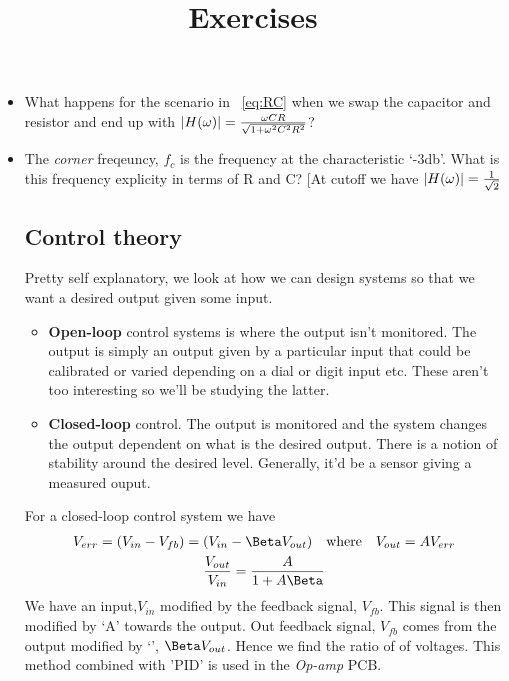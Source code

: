 \par
\title{\large{Exercises}}
\begin{itemize}
\item What happens for the scenario in ~\ref{eq:RC} when we swap the capacitor and resistor and end up with \begin{math}\abs{H(\omega)} = \frac{\omega CR}{\sqrt{1 + \omega^{2}C^{2}R^{2}}}\end{math}? 
\item The \textit{corner} freqeuncy, $f_c$ is the frequency at the characteristic `-3db'.  What is this frequency explicity in terms of R and C? [At cutoff we have \begin{math} \abs{H(\omega)} = \frac{1}{\sqrt{2}} \end{math}

\subsection{Control theory}
Pretty self explanatory, we look at how we can design systems so that we want a desired output given some input. 
\begin{itemize}
\item \textbf{Open-loop} control systems is where the output isn't monitored. The output is simply an output given by a particular input that could be calibrated or varied depending on a dial or digit input etc. These aren't too interesting so we'll be studying the latter.
\item \textbf{Closed-loop} control. The output is monitored and the system changes the output dependent on what is the desired output. There is a notion of stability around the desired level. Generally, it'd be a sensor giving a measured ouput.
\end{itemize}
For a closed-loop control system we have
\begin{equation}
\begin{gathered}
V_{err} = (V_{in} - V_{fb}) = (V_{in} - \Beta V_{out}) \quad \textrm{where} \quad V_{out} = AV_{err} \\ 
\frac{V_{out}}{V_{in}}=\frac{A}{1 +A\Beta}
\end{gathered}
\end{equation}
We have an input,$V_{in}$ modified by the feedback signal, $V_{fb}$. This signal is then modified by `A' towards the output. Out feedback signal, $V_{fb}$ comes from the output modified by `\Beta', $\Beta V_{out}$. Hence we find the ratio of of voltages. This method combined with 'PID' is used in the \textit{Op-amp} PCB.

\end{itemize}
